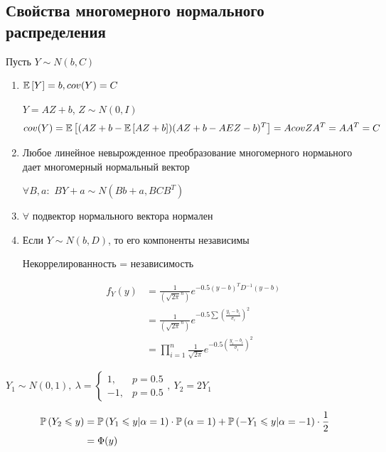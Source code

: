 \documentclass[a4paper, 10pt]{article}
\begin{document}
\subsection{Свойства многомерного нормального распределения}
Пусть $Y\sim N(b,C)$
\begin{enumerate}
    \item $\mathbb{E}\left[Y\right]=b,cov(Y)=C$
    
    \proof $Y=AZ+b$, $Z\sim N(0,I)$
    \begin{equation*}
        \begin{aligned}
            cov(Y)=\mathbb{E}\left[(AZ+b-\mathbb{E}\left[AZ+b\right])(AZ+b-AEZ-b)^T\right]=AcovZA^T=AA^T=C
        \end{aligned}
    \end{equation*}
    \item Любое линейное невырожденное преобразование многомерного нормаьного дает многомерный нормальный вектор
    
    $\forall B,a:$ $BY+a\sim N(Bb+a,BCB^T)$

    \item $\forall$ подвектор нормального вектора нормален 
    \item Если $Y\sim N(b,D)$, то его компоненты независимы
    
    \comment Некоррелированность = независимость

    \proof 
    \begin{equation*}
        \begin{aligned}
            f_Y(y)&=\frac{1}{(\sqrt{2\pi}^n)}e^{-0.5(y-b)^T D^{-1}(y-b)}\\
            &=\frac{1}{(\sqrt{2\pi}^n)}e^{-0.5\sum \left(\frac{y_i-b_i}{\sigma_i}\right)^2}\\
            &=\prod_{i=1}^n\frac{1}{\sqrt{2\pi}}e^{-0.5\left(\frac{y_i-b_i}{\sigma_i}\right)^2}
        \end{aligned}
    \end{equation*}
\end{enumerate}

\ex $Y_1\sim N(0,1),\ \lambda=\begin{cases}
    1,&p=0.5\\
    -1,&p=0.5
\end{cases},\ Y_2=2Y_1$

\begin{equation*}
    \begin{aligned}
        \mathbb{P}\left(Y_2\leqslant y\right)&=\mathbb{P}\left(Y_1\leqslant y|\alpha=1\right)\cdot\mathbb{P}\left(\alpha=1\right)+\mathbb{P}\left(-Y_1\leqslant y|\alpha=-1\right)\cdot\frac{1}{2}\\
        &=\Phi(y)
    \end{aligned}
\end{equation*}
\end{document}
